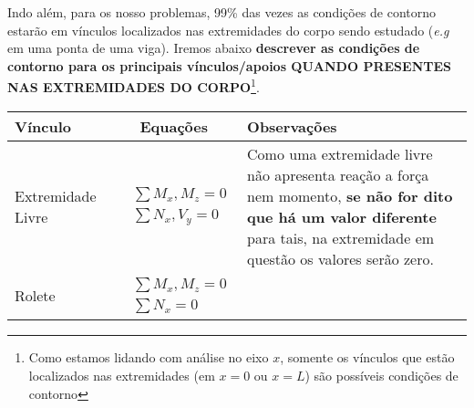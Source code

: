 \documentclass{article}
\begin{document}
            Indo além, para os nosso problemas, 99\% das vezes as condições de contorno estarão em vínculos localizados nas extremidades do corpo sendo estudado (\emph{e.g} em uma ponta de uma viga). Iremos abaixo
            \textbf{descrever as condições de contorno para os principais vínculos/apoios QUANDO PRESENTES NAS EXTREMIDADES DO CORPO}\footnote{Como estamos lidando com análise no eixo $x$, somente
            os vínculos que estão localizados nas extremidades (em $x=0$ ou $x=L$) são possíveis condições de contorno}.

            \begin{table}[h]
                \centering
                \begin{tabular}{|l|c|l|}\hline
                    \textbf{Vínculo} & \textbf{Equações} & \textbf{Observações} \\ \hline
                    Extremidade Livre  & 
                        \begin{minipage}{.4\textwidth}
                            {\begin{align*}
                                &\sum M_x, M_z = 0 \\ 
                                &\sum N_x, V_y = 0
                            \end{align*}}
                        \end{minipage} &
                        
                        \begin{minipage}{.4\textwidth}
                            \vspace{5px}
                            Como uma extremidade livre não apresenta reação a força nem momento, \textbf{se não for dito que há um valor diferente} para tais, na extremidade em questão os valores serão zero.
                        \end{minipage} \\ \hline

                    Rolete & 
                        \begin{minipage}{.4\textwidth}
                            {\begin{align*}
                                &\sum M_x, M_z = 0 \\
                                &\sum N_x = 0
                            \end{align*}}
                        \end{minipage} &
                        

\end{tabular}
\end{table}
\end{document}
